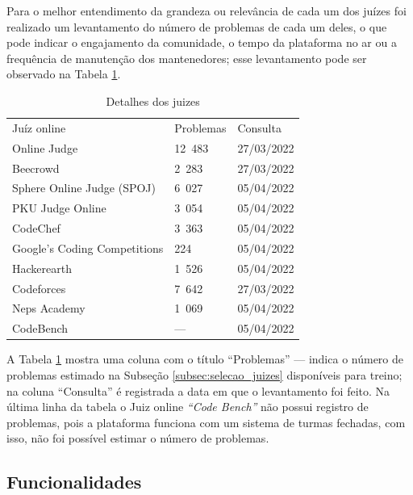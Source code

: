 Para o melhor entendimento da grandeza ou relevância de cada um dos juízes foi realizado um levantamento do número de problemas de cada um deles, o que pode indicar o engajamento da comunidade, o tempo da plataforma no ar ou a frequência de manutenção dos mantenedores; esse levantamento pode ser observado na Tabela \ref{table:detalhes_juizes}. 

\begin{table}[ht]
    \caption{Detalhes dos juizes}
    \centering
    \label{table:detalhes_juizes}
\begin{tabular}{lll}
\rowcolor[HTML]{CBCEFB} 
Juíz online         & Problemas & Consulta \\
Online Judge                 & 12 483              & 27/03/2022        \\
Beecrowd                     & 2 283               & 27/03/2022        \\
Sphere Online Judge (SPOJ)   & 6 027               & 05/04/2022        \\
PKU Judge Online             & 3 054               & 05/04/2022        \\
CodeChef                     & 3 363               & 05/04/2022        \\
Google's Coding Competitions & 224                & 05/04/2022        \\
Hackerearth                  & 1 526               & 05/04/2022        \\
Codeforces                   & 7 642               & 27/03/2022        \\
Neps Academy                 & 1 069               & 05/04/2022        \\
CodeBench                    & —                  & 05/04/2022       
\end{tabular}
\end{table}

A Tabela \ref{table:detalhes_juizes} mostra uma coluna com o título “Problemas” — indica o número de problemas estimado na Subseção \ref{subsec:selecao_juizes} disponíveis para treino; na coluna ``Consulta'' é registrada a data em que o levantamento foi feito. Na última linha da tabela o Juiz online \textit{“Code Bench”} não possui registro de problemas, pois a plataforma funciona com um sistema de turmas fechadas, com isso, não foi possível estimar o número de problemas.

\subsection{Funcionalidades}
\label{subsec:funcionalidades}

